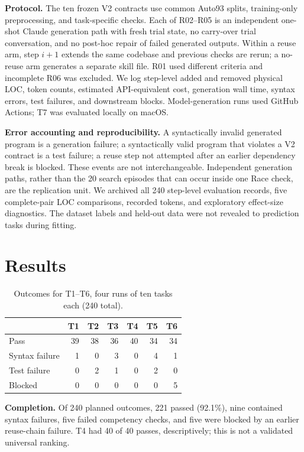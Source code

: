 \documentclass[sigconf,nonacm]{acmart}
\begin{document}
\textbf{Protocol.} The ten frozen V2 contracts use common Auto93 splits, training-only preprocessing, and task-specific checks. Each of R02--R05 is an independent one-shot Claude generation path with fresh trial state, no carry-over trial conversation, and no post-hoc repair of failed generated outputs. Within a reuse arm, step $i+1$ extends the same codebase and previous checks are rerun; a no-reuse arm generates a separate skill file. R01 used different criteria and incomplete R06 was excluded. We log step-level added and removed physical LOC, token counts, estimated API-equivalent cost, generation wall time, syntax errors, test failures, and downstream blocks. Model-generation runs used GitHub Actions; T7 was evaluated locally on macOS.

\textbf{Error accounting and reproducibility.} A syntactically invalid generated program is a generation failure; a syntactically valid program that violates a V2 contract is a test failure; a reuse step not attempted after an earlier dependency break is blocked. These events are not interchangeable. Independent generation paths, rather than the 20 search episodes that can occur inside one Race check, are the replication unit. We archived all 240 step-level evaluation records, five complete-pair LOC comparisons, recorded tokens, and exploratory effect-size diagnostics. The dataset labels and held-out data were not revealed to prediction tasks during fitting.

\section{Results}
\begin{table}[t]
\caption{Outcomes for T1--T6, four runs of ten tasks each (240 total).}
\label{tab:outcomes}\centering\scriptsize
\begin{tabular}{@{}lrrrrrr@{}}\toprule
 & T1 & T2 & T3 & T4 & T5 & T6 \\\midrule
Pass & 39 & 38 & 36 & 40 & 34 & 34\\
Syntax failure & 1 & 0 & 3 & 0 & 4 & 1\\
Test failure & 0 & 2 & 1 & 0 & 2 & 0\\
Blocked & 0 & 0 & 0 & 0 & 0 & 5\\\bottomrule
\end{tabular}
\end{table}
\textbf{Completion.} Of 240 planned outcomes, 221 passed (92.1\%), nine contained syntax failures, five failed competency checks, and five were blocked by an earlier reuse-chain failure. T4 had 40 of 40 passes, descriptively; this is not a validated universal ranking.
\end{document}

